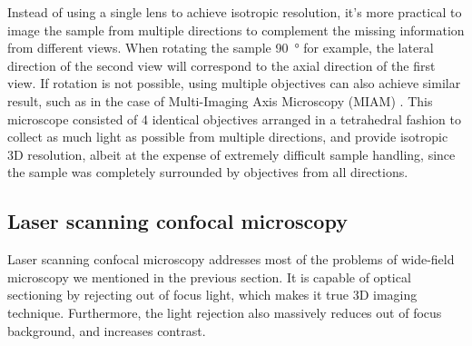   Instead of using a single lens to achieve isotropic resolution, it's more practical to image the sample from multiple directions to complement the missing information from different views. When rotating the sample \SI{90}{\degree} for example, the lateral direction of the second view will correspond to the axial direction of the first view. If rotation is not possible, using multiple objectives can also achieve similar result, such as in the case of Multi-Imaging Axis Microscopy (MIAM) \cite{swoger_multiple_2003,swoger_multi-view_2007}. This microscope consisted of 4 identical objectives arranged in a tetrahedral fashion to collect as much light as possible from multiple directions, and provide isotropic 3D resolution, albeit at the expense of extremely difficult sample handling, since the sample was completely surrounded by objectives from all directions. 






                                                              

  \subsection{Laser scanning confocal microscopy}
    Laser scanning confocal microscopy \cite{minsky_microscopy_1961,davidovits_scanning_1969} addresses most of the problems of wide-field microscopy we mentioned in the previous section. It is capable of optical sectioning by rejecting out of focus light, which makes it  true 3D imaging technique. Furthermore, the light rejection also massively reduces out of focus background, and increases contrast.

